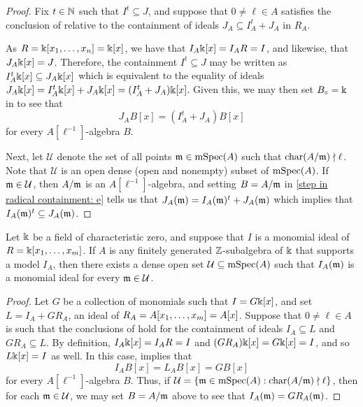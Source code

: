 \documentclass{amsart}
\begin{document}
\begin{proof}
   Fix $t \in \mathbb{N}$ such that $I^t \subseteq J$, and suppose that $0 \neq \ell \in A$ satisfies the conclusion of  relative to the containment of ideals $J_A \subseteq I_A^t + J_A$ in $R_A$.

As $R=\Bbbk[x_1, \ldots, x_n] = \Bbbk[x]$, we have that $I_A \Bbbk[x] = I_A R = I$, and likewise, that $J_A\Bbbk[x] = J$.  Therefore, the containment $I^t \subseteq J$ may be written as $I_A^t \Bbbk[x] \subseteq J_A \Bbbk[x]$
%
which is equivalent to the equality of ideals $J_A \Bbbk[x] = I_A^t \Bbbk[x] + J_A \Bbbk[x] = (I_A^t +J_A)\Bbbk[x]$.  Given this, we may then set $B_{\circ} = \Bbbk$ in  to see that
%
\begin{equation}
\label{step in radical containment: e}
 J_A B[x] = (I_A^t +J_A)B[x]
\end{equation}
%
for every $A[\ell^{-1}]$-algebra $B$.

Next, let $\mathcal{U}$ denote the set of all points $\mathfrak{m} \in \operatorname{mSpec}(A)$ such that $\operatorname{char}(A/\mathfrak{m}) \nmid \ell$.  Note that $\mathcal{U}$ is an open dense (\ie open and nonempty) subset of $\operatorname{mSpec}(A)$.  If $\mathfrak{m} \in \mathcal{U}$, then $A/\mathfrak{m}$ is an $A[\ell^{-1}]$-algebra, and setting $B=A/\mathfrak{m}$ in \eqref{step in radical containment: e} tells us that
%
$J_A (\mathfrak{m}) = I_A(\mathfrak{m})^t + J_A(\mathfrak{m})$
%
which implies that $I_A(\mathfrak{m})^t \subseteq J_A(\mathfrak{m})$.
\end{proof}

\begin{corollary}
\label{expansion of monomial mod most p is monomial: C}
Let $\Bbbk$ be a field of characteristic zero, and suppose that $I$ is a monomial ideal of $R=\Bbbk[x_1, \ldots, x_m]$.  If $A$ is any finitely generated $\mathbb{Z}$-subalgebra of $\Bbbk$ that supports a model $I_A$, then there exists a dense open set $\mathcal{U} \subseteq \operatorname{mSpec}(A)$ such that $I_A(\mathfrak{m})$ is a monomial ideal for every $\mathfrak{m} \in \mathcal{U}$.
\end{corollary}

\begin{proof}
   Let $G$ be a collection of monomials such that $I=G\Bbbk[x]$, and set $L = I_A + G R_A$, an ideal of $R_A=A[x_1, \ldots, x_m] = A[x]$.
   Suppose that $0 \neq \ell \in A$ is such that the conclusions of  hold for the containment of ideals $I_A \subseteq L$ and $GR_A \subseteq L$.  By definition,  $I_A \Bbbk[x] = I_A R = I$ and $(GR_A)\Bbbk[x] = G \Bbbk[x] = I$, and so $L\Bbbk[x] = I$ as well.
   In this case,  implies that
      \[
      I_A B[x] = L_A B[x] = G B[x]
   \]
 for every $A[\ell^{-1}]$-algebra $B$.    Thus, if $\mathcal{U} = \{ \mathfrak{m} \in \operatorname{mSpec}(A) : \operatorname{char}(A/\mathfrak{m}) \nmid \ell \}$,  then for each $\mathfrak{m} \in \mathcal{U}$, we may set $B=A/\mathfrak{m}$ above to see that $I_A(\mathfrak{m}) = G R_A(\mathfrak{m})$.
\end{proof}
\end{document}
